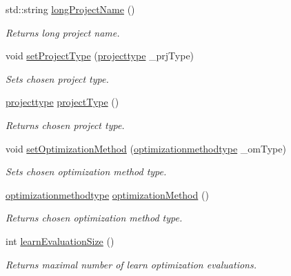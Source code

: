 \begin{DoxyCompactItemize}
std\-::string \hyperlink{class_go_s_u_m_1_1_c_container_a38869a1ee99c6a19a64a71ce56e5b88f}{long\-Project\-Name} ()
\begin{DoxyCompactList}\small\item\em Returns long project name. \end{DoxyCompactList}\item 
void \hyperlink{class_go_s_u_m_1_1_c_container_a5cb4d71e51d6ef0ad7b4b08b2c9c648d}{set\-Project\-Type} (\hyperlink{class_go_s_u_m_1_1_c_container_ab98aa1c7c84b62772c0f107a997b5076}{projecttype} \-\_\-prj\-Type)
\begin{DoxyCompactList}\small\item\em Sets chosen project type. \end{DoxyCompactList}\item 
\hyperlink{class_go_s_u_m_1_1_c_container_ab98aa1c7c84b62772c0f107a997b5076}{projecttype} \hyperlink{class_go_s_u_m_1_1_c_container_a3929863006e25f9b15ab705ccc3a6d2b}{project\-Type} ()
\begin{DoxyCompactList}\small\item\em Returns chosen project type. \end{DoxyCompactList}\item 
void \hyperlink{class_go_s_u_m_1_1_c_container_a00f2a1e85a2fc61a39154664ae2aa5f1}{set\-Optimization\-Method} (\hyperlink{class_go_s_u_m_1_1_c_container_a1bcf4ef46bf23d5c838e8a5c20953e82}{optimizationmethodtype} \-\_\-om\-Type)
\begin{DoxyCompactList}\small\item\em Sets chosen optimization method type. \end{DoxyCompactList}\item 
\hyperlink{class_go_s_u_m_1_1_c_container_a1bcf4ef46bf23d5c838e8a5c20953e82}{optimizationmethodtype} \hyperlink{class_go_s_u_m_1_1_c_container_a4f6b1e71a9909e1fb37fc9f73b5689ee}{optimization\-Method} ()
\begin{DoxyCompactList}\small\item\em Returns chosen optimization method type. \end{DoxyCompactList}\item 
int \hyperlink{class_go_s_u_m_1_1_c_container_adfb19bf17ae159250216d53780ae3134}{learn\-Evaluation\-Size} ()
\begin{DoxyCompactList}\small\item\em Returns maximal number of learn optimization evaluations. \end{DoxyCompactList}\item 

\end{DoxyCompactItemize}
